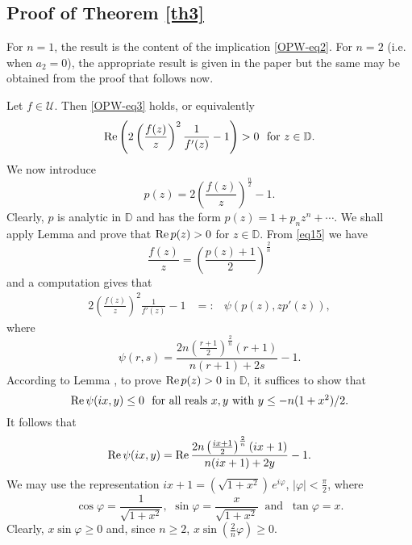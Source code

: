 \documentclass[a4paper,12pt]{amsart}
\theoremstyle{definition}
\newcounter{tmp}
\begin{document}
\subsection{Proof of Theorem \ref{th3}}
For $n=1$, the result is the content of the implication \eqref{OPW-eq2}.
For $n=2$ (i.e. when $a_{2}=0$), the appropriate result is given in the paper \cite{OP} but the same may
be obtained from the proof that follows now.

Let $f\in \mathcal{U}$. Then  \eqref{OPW-eq3} holds, or equivalently
$${\rm Re} \left (2\left(\frac{f(z)}{z}\right)^{2}\frac{1}{f'(z)}-1\right)>0~\mbox{ for $z\in {{\mathbb D}}$}.
$$
We now introduce
\begin{equation}\label{eq15}
p(z)=2\left(\frac{f(z)}{z}\right)^{\frac{n}{2}}-1.
\end{equation}
Clearly,  $p$ is analytic in ${{\mathbb D}}$ and has the form $p(z)=1+p_{n}z^{n}+ \cdots .$ We shall apply
Lemma {} and prove that ${\rm Re}\, p(z)>0$ for $z\in{{\mathbb D}}$.  From \eqref{eq15} we have
$$\frac{f(z)}{z}=\left(\frac{p(z)+1}{2}\right)^{\frac{2}{n}}
$$
and a computation gives that
\begin{eqnarray*}
2\left(\frac{f(z)}{z}\right)^{2}\frac{1}{f'(z)}-1 &=:& \psi (p(z),z p'(z)),
\end{eqnarray*}
where
\begin{equation}\label{eq16}
\psi (r,s)=\frac{2n\left(\frac{r+1}{2}\right)^{\frac{2}{n}}(r+1)}{n(r+1)+2s}-1 .
\end{equation}
According to Lemma {}, to prove ${\rm Re}\, p(z)>0$ in ${{\mathbb D}}$, it suffices to show that 
\begin{equation}\label{MM-eq2}
{\rm Re\,} \psi (ix,y)\leq 0 ~\mbox{ for all reals $x,y$  with $y\leq -n(1+x^2)/2$.}
\end{equation}
It follows that
\begin{equation}\label{eq17}
{\rm Re\,} \psi (ix,y)={\rm Re}\,\frac{2n\left(\frac{ix+1}{2}\right)^{\frac{2}{n}}(ix+1)}{n(ix+1)+2y}-1 .
\end{equation}
We may use the representation $ix+1= (\sqrt{1+x^2})\, e^{i\varphi}$, $|\varphi|< \frac{\pi}{2}$,
where
\begin{equation}\label{eq19}
\cos\varphi= \frac{1}{\sqrt{1+x^2}},\,\,\sin\varphi=\frac{x}{\sqrt{1+x^2}} ~\mbox{ and } ~\tan\varphi =x.
\end{equation}
Clearly, $x \sin\varphi\geq 0 $ and, since $n\geq 2$, $x \sin\left(\frac{2}{n}\varphi\right)\geq 0 $.
\end{document}
